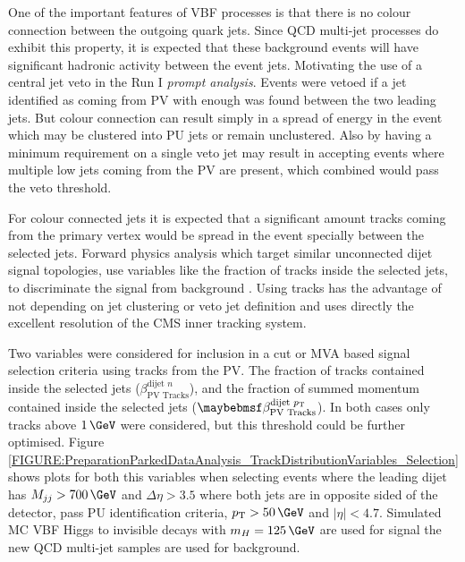 %
%


One of the important features of \gls{VBF} processes is that there is no colour connection between the outgoing quark jets. Since \gls{QCD} multi-jet processes do exhibit this property, it is expected that these background events will have significant hadronic activity between the event jets. Motivating the use of a central jet veto in the Run I \textit{prompt analysis}. Events were vetoed if a jet identified as coming from \gls{PV} with enough \pt was found between the two leading jets. But colour connection can result simply in a spread of energy in the event which may be clustered into \gls{PU} jets or remain unclustered. Also by having a minimum \pt requirement on a single veto jet may result in accepting events where multiple low \pt jets coming from the \gls{PV} are present, which combined would pass the veto threshold.

For colour connected jets it is expected that a significant amount tracks coming from the primary vertex would be spread in the event specially between the selected jets. Forward physics analysis which target similar unconnected dijet signal topologies, use variables like the fraction of tracks inside the selected jets, to discriminate the signal from background \cite{ARTICLE:AnalysisDiffractiveJets}. Using tracks has the advantage of not depending on jet clustering or veto jet definition and uses directly the excellent resolution of the \gls{CMS} inner tracking system. 

Two variables were considered for inclusion in a cut or \gls{MVA} based signal selection criteria using tracks from the \gls{PV}. The fraction of tracks contained inside the selected jets ($\beta_{\text{PV Tracks}}^{\text{dijet }n}$), and the fraction of summed momentum contained inside the selected jets ($\beta_{\text{PV Tracks}}^{\text{dijet }\pt}$). In both cases only tracks above $1\,\GeV$ were considered, but this threshold could be further optimised. Figure \ref{FIGURE:PreparationParkedDataAnalysis_TrackDistributionVariables_Selection} shows plots for both this variables when selecting events where the leading dijet has $M_{jj}>700\,\GeV$ and $\Delta\eta>3.5$ where both jets are in opposite sided of the detector, pass \gls{PU} identification criteria, $\pt>50\,\GeV$ and $|\eta|<4.7$. Simulated \gls{MC} \gls{VBF} Higgs to invisible decays with $m_H=125\,\GeV$ are used for signal the new \gls{QCD} multi-jet samples are used for background.

